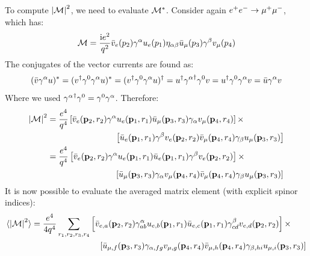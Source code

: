 To compute $ \left\lvert\mathcal{M}\right\rvert^2 $, we need to evaluate $ \mathcal{M}^* $. Consider again $ e^+ e^- \rightarrow \mu^+ \mu^- $, which has:
\begin{equation*}
  \mathcal{M} = \frac{\mathrm{i} e^2}{q^2} \bar{v}_e(p_2) \gamma^\alpha u_e(p_1) \eta_{\alpha \beta} \bar{u}_\mu(p_3) \gamma^\beta v_\mu(p_4)
\end{equation*}
The conjugates of the vector currents are found as:
\begin{equation*}
  (\bar{v} \gamma^\alpha u)^* = (v^\dagger \gamma^0 \gamma^\alpha u)^* = (v^\dagger \gamma^0 \gamma^\alpha u)^\dagger = u^\dagger {\gamma^\alpha}^\dagger \gamma^0 v = u^\dagger \gamma^0 \gamma^\alpha v = \bar{u} \gamma^\alpha v
\end{equation*}
Where we used $ {\gamma^\alpha}^\dagger \gamma^0 = \gamma^0 \gamma^\alpha $. Therefore:
\begin{equation*}
  \begin{split}
    \left\lvert\mathcal{M}\right\rvert^2
    & = \frac{e^4}{q^4} \left[ \bar{v}_e(\mathbf{p}_2 , r_2) \gamma^\alpha u_e(\mathbf{p}_1 , r_1) \bar{u}_\mu(\mathbf{p}_3 , r_3) \gamma_\alpha v_\mu(\mathbf{p}_4 , r_4) \right] \times \\
    & \qquad \qquad \qquad \qquad \left[ \bar{u}_e(\mathbf{p}_1 , r_1) \gamma^\beta v_e(\mathbf{p}_2 , r_2) \bar{v}_\mu(\mathbf{p}_4 , r_4) \gamma_\beta u_\mu(\mathbf{p}_3 , r_3) \right] \\
    & = \frac{e^4}{q^4} \left[ \bar{v}_e(\mathbf{p}_2 , r_2) \gamma^\alpha u_e(\mathbf{p}_1 , r_1) \bar{u}_e(\mathbf{p}_1 , r_1) \gamma^\beta v_e(\mathbf{p}_2 , r_2) \right] \times \\
    & \qquad \qquad \qquad \qquad \left[ \bar{u}_\mu(\mathbf{p}_3 , r_3) \gamma_\alpha v_\mu(\mathbf{p}_4 , r_4) \bar{v}_\mu(\mathbf{p}_4 , r_4) \gamma_\beta u_\mu(\mathbf{p}_3 , r_3) \right]
  \end{split}
\end{equation*}
It is now possible to evaluate the averaged matrix element (with explicit spinor indices):
\begin{equation*}
  \begin{split}
    \braket{\left\lvert\mathcal{M}\right\rvert^2}
    & = \frac{e^4}{4q^4} \sum_{r_1 , r_2 , r_3 , r_4} \left[ \bar{v}_{e,a}(\mathbf{p}_2 , r_2) \gamma^\alpha_{ab} u_{e,b}(\mathbf{p}_1 , r_1) \bar{u}_{e,c}(\mathbf{p}_1 , r_1) \gamma^\beta_{cd} v_{e,d}(\mathbf{p}_2 , r_2) \right] \times \\
    & \qquad \qquad \qquad \qquad \left[ \bar{u}_{\mu,f}(\mathbf{p}_3 , r_3) \gamma_{\alpha,fg} v_{\mu,g}(\mathbf{p}_4 , r_4) \bar{v}_{\mu,h}(\mathbf{p}_4 , r_4) \gamma_{\beta,hi} u_{\mu,i}(\mathbf{p}_3 , r_3) \right]
  \end{split}
\end{equation*}
